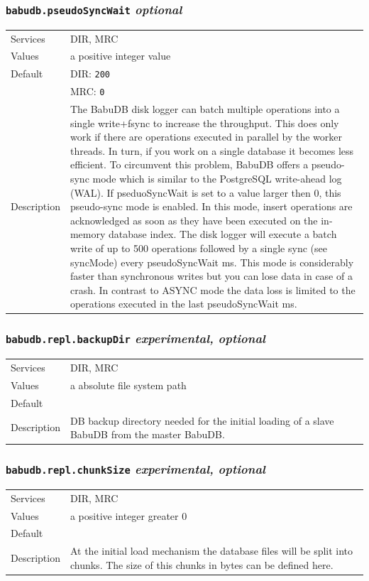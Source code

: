\documentclass[a4paper,10pt]{book}
\begin{document}
\subsubsection{\texttt{babudb.pseudoSyncWait} \textit{optional}}
\begin{tabular}{lp{10cm}}
 Services & DIR, MRC\\
 Values   & a positive integer value\\
 Default  & DIR: \texttt{200}\\
          & MRC: \texttt{0}\\
 Description & The BabuDB disk logger can batch multiple operations into a single write+fsync to increase the throughput. This does only work if there are operations executed in parallel by the worker threads. In turn, if you work on a single database it becomes less efficient. To circumvent this problem, BabuDB offers a pseudo-sync mode which is similar to the PostgreSQL write-ahead log (WAL). If pseduoSyncWait is set to a value larger then 0, this pseudo-sync mode is enabled. In this mode, insert operations are acknowledged as soon as they have been executed on the in-memory database index. The disk logger will execute a batch write of up to 500 operations followed by a single sync (see syncMode) every pseudoSyncWait ms. This mode is considerably faster than synchronous writes but you can lose data in case of a crash. In contrast to ASYNC mode the data loss is limited to the operations executed in the last pseudoSyncWait ms.
\end{tabular}

\subsubsection{\texttt{babudb.repl.backupDir} \textit{experimental, optional}}
\begin{tabular}{lp{10cm}}
 Services & DIR, MRC\\
 Values   & a absolute file system path\\
 Default  & \\
 Description & DB backup directory needed for the initial loading of a slave BabuDB from the master BabuDB.
\end{tabular}

\subsubsection{\texttt{babudb.repl.chunkSize} \textit{experimental, optional}}
\begin{tabular}{lp{10cm}}
 Services & DIR, MRC\\
 Values   & a positive integer greater 0\\
 Default  & \\
 Description & At the initial load mechanism the database files will be split into chunks. The size of this chunks in bytes can be defined here.
\end{tabular}
\end{document}
